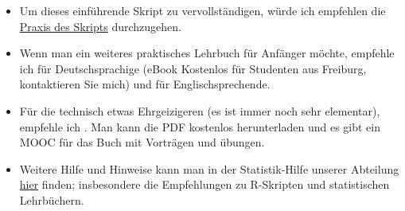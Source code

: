 \documentclass[a4paper,twoside]{tufte-book}\usepackage[]{graphicx}\usepackage[]{color}
\begin{document}
\begin{itemize}

\item Um dieses einführende Skript zu vervollständigen, würde ich empfehlen die \href{https://github.com/florianhartig/ResearchSkills/tree/master/Labs/Statistics}{Praxis des Skripts} durchzugehen.

\item Wenn man ein weiteres praktisches Lehrbuch für Anfänger möchte, empfehle ich \citet{Dormann-ParametrischeStatistik-2013} für Deutschsprachige (eBook Kostenlos für Studenten aus Freiburg, kontaktieren Sie mich) und \citet{Gotelli-PrimerEcologicalStatistics-2004} für Englischsprechende. 

\item Für die technisch etwas Ehrgeizigeren (es ist immer noch sehr elementar), empfehle ich \citet{James-IntroductiontoStatistical-2013}. Man kann die PDF kostenlos herunterladen und es gibt ein MOOC für das Buch mit Vorträgen und übungen.

\item Weitere Hilfe und Hinweise kann man in der Statistik-Hilfe unserer Abteilung \href{http://biometry.github.io/APES/}{hier} finden; insbesondere die Empfehlungen zu R-Skripten und statistischen Lehrbüchern.

\end{itemize}





\end{document}
